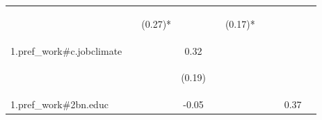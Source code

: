 \begin{center}
\begin{tabular}{lccccccccc}
 & \begin{footnotesize}\end{footnotesize} & \begin{footnotesize}(0.27)*\end{footnotesize} & \begin{footnotesize}\end{footnotesize} & \begin{footnotesize}\end{footnotesize} & \begin{footnotesize}(0.17)*\end{footnotesize} & \begin{footnotesize}\end{footnotesize} & \begin{footnotesize}\end{footnotesize} & \begin{footnotesize}\end{footnotesize} & \begin{footnotesize}\end{footnotesize}\\
\noalign{\smallskip}1.pref_work\#c.jobclimate &  &  & 0.32 &  &  &  &  &  & \\
 & \begin{footnotesize}\end{footnotesize} & \begin{footnotesize}\end{footnotesize} & \begin{footnotesize}(0.19)\end{footnotesize} & \begin{footnotesize}\end{footnotesize} & \begin{footnotesize}\end{footnotesize} & \begin{footnotesize}\end{footnotesize} & \begin{footnotesize}\end{footnotesize} & \begin{footnotesize}\end{footnotesize} & \begin{footnotesize}\end{footnotesize}\\
\noalign{\smallskip}1.pref_work\#2bn.educ &  &  & -0.05 &  &  &  &  & 0.37 & \\

\end{tabular}
\end{center}
